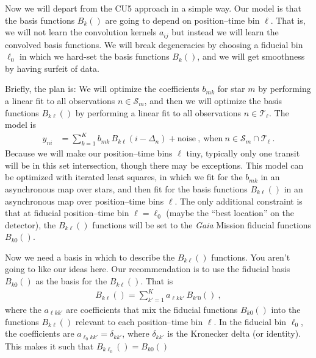 \documentclass{article}
\newcommand{\set}[1]{\mathscr{#1}}
\begin{document}
Now we will depart from the CU5 approach in a simple way.
Our model is that the basis functions $B_k()$ are going to depend on position--time bin $\ell$.
That is, we will not learn the convolution kernels $a_{ij}$ but instead we will learn the convolved basis functions.
We will break degeneracies by choosing a fiducial bin $\ell_0$ in which we hard-set the basis functions $B_k()$, and we will get smoothness by having surfeit of data.

Briefly, the plan is: We will optimize the coefficients $b_{mk}$ for star $m$ by performing a linear fit to all observations $n\in\set{S}_m$, and then we will optimize the basis functions $B_{k\ell}()$ by performing a linear fit to all observations $n\in\set{T}_\ell$.
The model is
\begin{align}
    y_{ni} &= \sum_{k=1}^K b_{mk}\,B_{k\ell}(i-\Delta_n)+\text{noise} ~,~ \text{when} ~ n\in\set{S}_m\cap\set{T}_\ell ~.
\end{align}
Because we will make our position--time bins $\ell$ tiny, typically only one transit will be in this set intersection, though there may be exceptions.
This model can be optimized with iterated least squares, in which we fit for the $b_{mk}$ in an asynchronous map over stars, and then fit for the basis functions $B_{k\ell}()$ in an asynchronous map over position--time bins $\ell$.
The only additional constraint is that at fiducial position--time bin $\ell=\ell_0$ (maybe the ``best location'' on the detector), the $B_{k\ell}()$ functions will be set to the \textsl{Gaia} Mission fiducial functions $B_{k0}()$.

Now we need a basis in which to describe the $B_{k\ell}()$ functions.
You aren't going to like our ideas here.
Our recommendation is to use the fiducial basis $B_{k0}()$ as the basis for the $B_{k\ell}()$.
That is
\begin{align}
    B_{k\ell}() = \sum_{k'=1}^{K} a_{\ell kk'}\,B_{k'0}() ~,
\end{align}
where the $a_{\ell kk'}$ are coefficients that mix the fiducial functions $B_{k0}()$ into the functions $B_{k\ell}()$ relevant to each position--time bin $\ell$.
In the fiducial bin $\ell_0$, the coefficients are $a_{\ell_0 kk'} = \delta_{kk'}$, where $\delta_{kk'}$ is the Kronecker delta (or identity).
This makes it such that $B_{k\ell_0}()=B_{k0}()$
\end{document}
